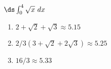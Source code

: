 {$\ds \int_{0}^{4} \sqrt x\ dx$}
{\begin{enumerate}
\item		$2+\sqrt2+\sqrt3\approx 5.15$
\item		$2/3(3+\sqrt2+2\sqrt3)\approx 5.25$
\item		$16/3\approx 5.33$
\end{enumerate}
}